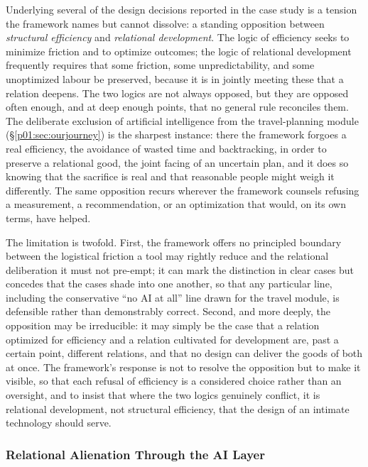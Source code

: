 Underlying several of the design decisions reported in the case study is a tension the framework names but cannot dissolve: a standing opposition between \emph{structural efficiency} and \emph{relational development}. The logic of efficiency seeks to minimize friction and to optimize outcomes; the logic of relational development frequently requires that some friction, some unpredictability, and some unoptimized labour be preserved, because it is in jointly meeting these that a relation deepens. The two logics are not always opposed, but they are opposed often enough, and at deep enough points, that no general rule reconciles them. The deliberate exclusion of artificial intelligence from the travel-planning module (§\ref{p01:sec:ourjourney}) is the sharpest instance: there the framework forgoes a real efficiency, the avoidance of wasted time and backtracking, in order to preserve a relational good, the joint facing of an uncertain plan, and it does so knowing that the sacrifice is real and that reasonable people might weigh it differently. The same opposition recurs wherever the framework counsels refusing a measurement, a recommendation, or an optimization that would, on its own terms, have helped.

The limitation is twofold. First, the framework offers no principled boundary between the logistical friction a tool may rightly reduce and the relational deliberation it must not pre-empt; it can mark the distinction in clear cases but concedes that the cases shade into one another, so that any particular line, including the conservative ``no AI at all'' line drawn for the travel module, is defensible rather than demonstrably correct. Second, and more deeply, the opposition may be irreducible: it may simply be the case that a relation optimized for efficiency and a relation cultivated for development are, past a certain point, different relations, and that no design can deliver the goods of both at once. The framework's response is not to resolve the opposition but to make it visible, so that each refusal of efficiency is a considered choice rather than an oversight, and to insist that where the two logics genuinely conflict, it is relational development, not structural efficiency, that the design of an intimate technology should serve.

\subsubsection{Relational Alienation Through the AI Layer}

